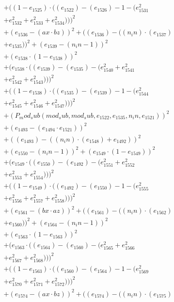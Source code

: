 \documentclass[10pt, a4paper]{article}
\begin{document}
\begin{small}
\begin{align*}
& + ((1 - e_{1525})  \cdot  ((e_{1522}) - (e_{1526}) - 1 - (e_{1531}^{2} \\
& + e_{1532}^{2} + e_{1533}^{2} + e_{1534}^{2})))^{2} \\
& + (e_{1536} - (ax  \cdot  bz))^{2} + ((e_{1536}) - ((n_in)  \cdot  (e_{1537}) \\
& + e_{1535}))^{2} + (e_{1539} - (n_in - 1))^{2} \\
& + (e_{1538}  \cdot  (1 - e_{1538}))^{2} \\
& + (e_{1538}  \cdot  ((e_{1539}) - (e_{1535}) - (e_{1540}^{2} + e_{1541}^{2} \\
& + e_{1542}^{2} + e_{1543}^{2})))^{2} \\
& + ((1 - e_{1538})  \cdot  ((e_{1535}) - (e_{1539}) - 1 - (e_{1544}^{2} \\
& + e_{1545}^{2} + e_{1546}^{2} + e_{1547}^{2})))^{2} \\
& + (P_mod_sub(mod_sub, mod_sub, e_{1522}, e_{1535}, n_in, e_{1521}))^{2} \\
& + (e_{1493} - (e_{1494}  \cdot  e_{1521}))^{2} \\
& + ((e_{1493}) - ((n_in)  \cdot  (e_{1548}) + e_{1492}))^{2} \\
& + (e_{1550} - (n_in - 1))^{2} + (e_{1549}  \cdot  (1 - e_{1549}))^{2} \\
& + (e_{1549}  \cdot  ((e_{1550}) - (e_{1492}) - (e_{1551}^{2} + e_{1552}^{2} \\
& + e_{1553}^{2} + e_{1554}^{2})))^{2} \\
& + ((1 - e_{1549})  \cdot  ((e_{1492}) - (e_{1550}) - 1 - (e_{1555}^{2} \\
& + e_{1556}^{2} + e_{1557}^{2} + e_{1558}^{2})))^{2} \\
& + (e_{1561} - (bx  \cdot  az))^{2} + ((e_{1561}) - ((n_in)  \cdot  (e_{1562}) \\
& + e_{1560}))^{2} + (e_{1564} - (n_in - 1))^{2} \\
& + (e_{1563}  \cdot  (1 - e_{1563}))^{2} \\
& + (e_{1563}  \cdot  ((e_{1564}) - (e_{1560}) - (e_{1565}^{2} + e_{1566}^{2} \\
& + e_{1567}^{2} + e_{1568}^{2})))^{2} \\
& + ((1 - e_{1563})  \cdot  ((e_{1560}) - (e_{1564}) - 1 - (e_{1569}^{2} \\
& + e_{1570}^{2} + e_{1571}^{2} + e_{1572}^{2})))^{2} \\
& + (e_{1574} - (ax  \cdot  bz))^{2} + ((e_{1574}) - ((n_in)  \cdot  (e_{1575}) \\

\end{align*}
\end{small}
\end{document}
